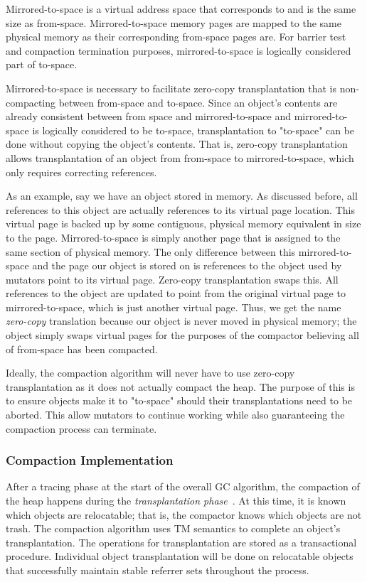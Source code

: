 \documentclass{sig-alternate}
\begin{document}
Mirrored-to-space is a virtual address space that corresponds to and is the same
size as from-space. Mirrored-to-space memory pages are mapped to the same physical
memory as their corresponding from-space pages are. For barrier test and compaction 
termination purposes, mirrored-to-space is logically considered part of to-space.

Mirrored-to-space is necessary to facilitate zero-copy transplantation that is 
non-compacting between from-space and to-space. Since an object's contents are 
already consistent between from space and mirrored-to-space and mirrored-to-space
is logically considered to be to-space, transplantation to "to-space"
can be done without copying the object's contents. That is, zero-copy transplantation
allows transplantation of an object from from-space to mirrored-to-space, which only
requires correcting references.

As an example, say we have an object stored in memory. As discussed before, all references
to this object are actually references to its virtual page location. This virtual page
is backed up by some contiguous, physical memory equivalent in size to the page. 
Mirrored-to-space is simply another page that is assigned to the same section of physical memory. 
The only difference between this mirrored-to-space and the page our object is stored on
is references to the object used by mutators point to its virtual page.
Zero-copy transplantation swaps this. All references to the object are
updated to point from the original virtual page to mirrored-to-space, which
is just another virtual page. Thus, we get the name \emph{zero-copy} translation
because our object is never moved in physical memory; the object simply
swaps virtual pages for the purposes of the compactor believing all of from-space
has been compacted.

Ideally, the compaction algorithm will never have to use zero-copy transplantation
as it does not actually compact the heap. The purpose of this is to ensure
objects make it to "to-space" should their transplantations need to be aborted. 
This allow mutators to continue working while also guaranteeing the compaction 
process can terminate.


\subsubsection{Compaction Implementation}
\label{sec:collieAlgorithmImplementation}

After a tracing phase at the start of the overall GC algorithm, the compaction of
the heap happens during the \emph{transplantation phase}~\cite{Iyengar:Collie}.
At this time, it is known which objects are relocatable; that is, the compactor knows which 
objects are not trash. The compaction algorithm uses TM semantics to complete an object's
transplantation. The operations for transplantation are stored as a
transactional procedure. Individual object transplantation will be done on relocatable objects 
that successfully maintain stable referrer sets throughout the process.
\end{document}
